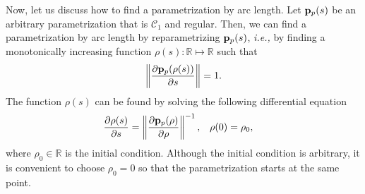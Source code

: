 Now, let us discuss how to find a parametrization by arc length.
Let $\mathbf{p}_p(s)$ be an arbitrary parametrization that is $\mathcal{C}_1$ and regular.
Then, we can find a parametrization by arc length by reparametrizing $\mathbf{p}_p(s)$, \emph{i.e.,} by finding a monotonically increasing function $\rho(s) : \mathbb{R} \mapsto \mathbb{R}$ such that
\begin{equation}
    \left\|\frac{\partial \mathbf{p}_p(\rho(s))}{\partial s}\right\| = 1.
\end{equation}
The function $\rho(s)$ can be found by solving the following differential equation
\begin{align}
    \frac{\partial \rho(s)}{\partial s} &= \left\|\frac{\partial \mathbf{p}_p(\rho)}{\partial \rho}\right\|^{-1}, &
    \rho(0) &= \rho_0,
\end{align}
where $\rho_0 \in \mathbb{R}$ is the initial condition.
Although the initial condition is arbitrary, it is convenient to choose $\rho_0 = 0$ so that the parametrization starts at the same point.
